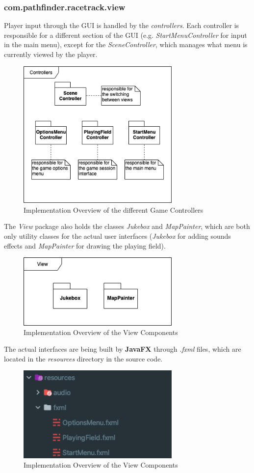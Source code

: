 			\newpage

			\subsubsection{com.pathfinder.racetrack.view}
				Player input through the GUI is handled by the \textit{controllers}. Each controller is responsible for a different section of the GUI (e.g. \textit		{StartMenuController} for input in the main menu), except for the \textit{SceneController}, which manages what menu is currently viewed by the player.
				\begin{figure}[H]
					\centering
					\includegraphics[width=8cm,keepaspectratio,center]{img/Implementation_Code_Controllers.png}
					\caption{Implementation Overview of the different Game Controllers}
				\end{figure}
				The \textit{View} package also holds the classes \textit{Jukebox} and \textit{MapPainter}, which are both only utility classes for the actual user interfaces (\textit{Jukebox} for adding sounds effects and \textit{MapPainter} for drawing the playing field).
				\begin{figure}[H]
					\centering
					\includegraphics[width=8cm,keepaspectratio,center]{img/Implementation_Code_View.png}
					\caption{Implementation Overview of the View Components}
				\end{figure}
				The actual interfaces are being built by \textbf{JavaFX} through \textit{.fxml} files, which are located in the \textit{resources} directory in the source code.
				\begin{figure}[H]
					\centering
					\includegraphics[width=8cm,keepaspectratio,center]{img/Implementation_Code_Resources.png}
					\caption{Implementation Overview of the View Components}
				\end{figure}
